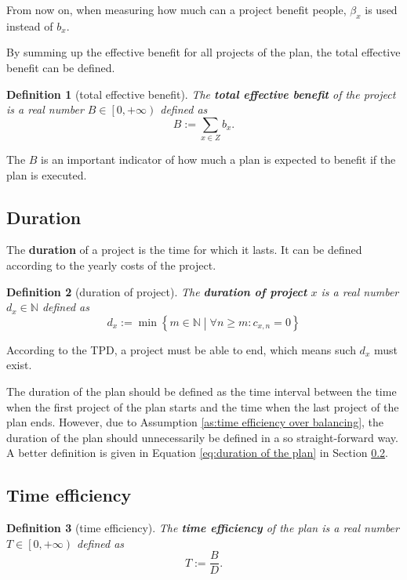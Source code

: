 \documentclass{article}
\newtheorem{definition}{Definition}
\begin{document}
From now on, when measuring how much can a project benefit people,
$\beta_x$ is used instead of $b_x$.

By summing up the effective benefit for all projects of the plan, the total effective benefit can be defined.

\begin{definition}[total effective benefit]
The \textbf{total effective benefit} of the project is a real number $B\in\left[0,+\infty\right)$ defined as
\begin{equation}
B:=\sum_{x\in Z}b_x.
\end{equation}
\end{definition}

The $B$ is an important indicator of how much a plan is expected to benefit if the plan is executed.

\subsection{Duration}
\label{sec:duration}

The \textbf{duration} of a project is the time for which it lasts.
It can be defined according to the yearly costs of the project.

\begin{definition}[duration of project]
The \textbf{duration of project} $x$ is a real number $d_x\in\mathbb N$ defined as
\begin{equation}
d_x:=\min\left\{m\in\mathbb N\middle|\forall n\ge m:c_{x,n}=0\right\}
\end{equation}
\end{definition}

According to the TPD, a project must be able to end, which means such $d_x$ must exist.

The duration of the plan should be defined as the time interval between the time when the first project of the plan starts and the time when the last project of the plan ends.
However, due to Assumption \ref{as:time efficiency over balancing}, the duration of the plan should unnecessarily be defined in a so straight-forward way.
A better definition is given in Equation \ref{eq:duration of the plan} in Section \ref{sec:time efficiency}.

\subsection{Time efficiency}
\label{sec:time efficiency}

\begin{definition}[time efficiency]
The \textbf{time efficiency} of the plan is a real number $T\in\left[0,+\infty\right)$ defined as
\begin{equation}
T:=\frac BD.
\end{equation}
\end{definition}
\end{document}
